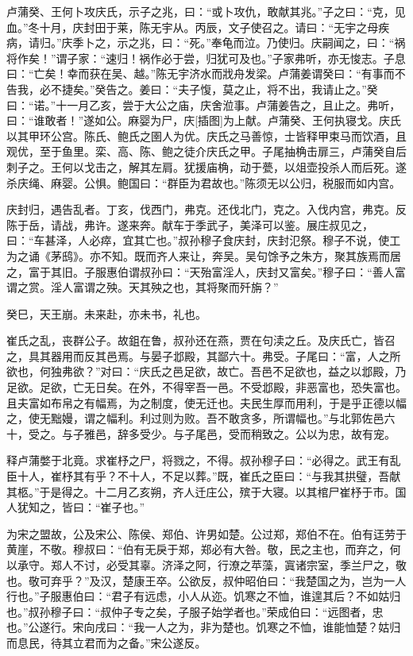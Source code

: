 \documentclass[a4paper,12pt,UTF8,twoside]{ctexbook}
\begin{document}
卢蒲癸、王何卜攻庆氏，示子之兆，曰：“或卜攻仇，敢献其兆。”子之曰：“克，见血。”冬十月，庆封田于莱，陈无宇从。丙辰，文子使召之。请曰：“无宇之母疾病，请归。”庆季卜之，示之兆，曰：“死。”奉龟而泣。乃使归。庆嗣闻之，曰：“祸将作矣！”谓子家：“速归！祸作必于尝，归犹可及也。”子家弗听，亦无悛志。子息曰：“亡矣！幸而获在吴、越。”陈无宇济水而戕舟发梁。卢蒲姜谓癸曰：“有事而不告我，必不捷矣。”癸告之。姜曰：“夫子愎，莫之止，将不出，我请止之。”癸曰：“诺。”十一月乙亥，尝于大公之庙，庆舍涖事。卢蒲姜告之，且止之。弗听，曰：“谁敢者！”遂如公。麻婴为尸，庆[插图]为上献。卢蒲癸、王何执寝戈。庆氏以其甲环公宫。陈氏、鲍氏之圉人为优。庆氏之马善惊，士皆释甲束马而饮酒，且观优，至于鱼里。栾、高、陈、鲍之徒介庆氏之甲。子尾抽桷击扉三，卢蒲癸自后刺子之。王何以戈击之，解其左肩。犹援庙桷，动于甍，以俎壶投杀人而后死。遂杀庆绳、麻婴。公惧。鲍国曰：“群臣为君故也。”陈须无以公归，税服而如内宫。

庆封归，遇告乱者。丁亥，伐西门，弗克。还伐北门，克之。入伐内宫，弗克。反陈于岳，请战，弗许。遂来奔。献车于季武子，美泽可以鉴。展庄叔见之，曰：“车甚泽，人必瘁，宜其亡也。”叔孙穆子食庆封，庆封氾祭。穆子不说，使工为之诵《茅鸱》。亦不知。既而齐人来让，奔吴。吴句馀予之朱方，聚其族焉而居之，富于其旧。子服惠伯谓叔孙曰：“天殆富淫人，庆封又富矣。”穆子曰：“善人富谓之赏。淫人富谓之殃。天其殃之也，其将聚而歼旃？”

癸巳，天王崩。未来赴，亦未书，礼也。

崔氏之乱，丧群公子。故鉏在鲁，叔孙还在燕，贾在句渎之丘。及庆氏亡，皆召之，具其器用而反其邑焉。与晏子邶殿，其鄙六十。弗受。子尾曰：“富，人之所欲也，何独弗欲？”对曰：“庆氏之邑足欲，故亡。吾邑不足欲也，益之以邶殿，乃足欲。足欲，亡无日矣。在外，不得宰吾一邑。不受邶殿，非恶富也，恐失富也。且夫富如布帛之有幅焉，为之制度，使无迁也。夫民生厚而用利，于是乎正德以幅之，使无黜嫚，谓之幅利。利过则为败。吾不敢贪多，所谓幅也。”与北郭佐邑六十，受之。与子雅邑，辞多受少。与子尾邑，受而稍致之。公以为忠，故有宠。

释卢蒲嫳于北竟。求崔杼之尸，将戮之，不得。叔孙穆子曰：“必得之。武王有乱臣十人，崔杼其有乎？不十人，不足以葬。”既，崔氏之臣曰：“与我其拱璧，吾献其柩。”于是得之。十二月乙亥朔，齐人迁庄公，殡于大寝。以其棺尸崔杼于市。国人犹知之，皆曰：“崔子也。”

为宋之盟故，公及宋公、陈侯、郑伯、许男如楚。公过郑，郑伯不在。伯有迋劳于黄崖，不敬。穆叔曰：“伯有无戾于郑，郑必有大咎。敬，民之主也，而弃之，何以承守。郑人不讨，必受其辜。济泽之阿，行潦之苹藻，寘诸宗室，季兰尸之，敬也。敬可弃乎？”及汉，楚康王卒。公欲反，叔仲昭伯曰：“我楚国之为，岂为一人行也。”子服惠伯曰：“君子有远虑，小人从迩。饥寒之不恤，谁遑其后？不如姑归也。”叔孙穆子曰：“叔仲子专之矣，子服子始学者也。”荣成伯曰：“远图者，忠也。”公遂行。宋向戌曰：“我一人之为，非为楚也。饥寒之不恤，谁能恤楚？姑归而息民，待其立君而为之备。”宋公遂反。
\end{document}
